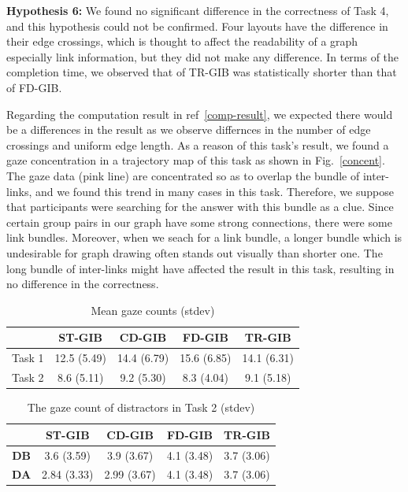 \documentclass{vgtc}                          %
\begin{document}
{\bf Hypothesis 6:} We found no significant difference in the correctness of Task 4, and this hypothesis could not be confirmed.
Four layouts have the difference in their edge crossings, which is thought to affect the readability of a graph especially link information, but they did not make any difference.
In terms of the completion time, we observed that of TR-GIB was statistically shorter than that of FD-GIB.

Regarding the computation result in ref~\ref{comp-result}, we expected there would be a differences in the result as we observe differnces in the number of edge crossings and uniform edge length.
As a reason of this task's result, we found a gaze concentration in a trajectory map of this task as shown in Fig.~\ref{concent}.
The gaze data (pink line) are concentrated so as to overlap the bundle of inter-links, and we found this trend in many cases in this task.
Therefore, we suppose that participants were searching for the answer with this bundle as a clue.
Since certain group pairs in our graph have some strong connections, there were some link bundles.
Moreover, when we seach for a link bundle, a longer bundle which is undesirable for graph drawing often stands out visually than shorter one.
The long bundle of inter-links might have affected the result in this task, resulting in no difference in the correctness.

\begin{table}[htb]
  \begin{center}
   \caption{Mean gaze counts (stdev)}
    \begin{tabular}{|c|c|c|c|c|} \hline
      & ST-GIB & CD-GIB & FD-GIB & TR-GIB \\ \hline
      Task 1 & 12.5 (5.49) & 14.4 (6.79) & 15.6 (6.85) & 14.1 (6.31) \\ \hline
      Task 2 & 8.6 (5.11) & 9.2 (5.30) & 8.3 (4.04) & 9.1 (5.18) \\ \hline
    \end{tabular}
  \end{center}
  \label{table-gazecount}
\end{table}

\begin{table}[htb]
  \begin{center}
   \caption{The gaze count of distractors in Task 2 (stdev)}
    \begin{tabular}{|c|c|c|c|c|} \hline
      & ST-GIB & CD-GIB & FD-GIB & TR-GIB \\ \hline
      {\bf DB} & 3.6 (3.59) & 3.9 (3.67) & 4.1 (3.48) & 3.7 (3.06) \\ \hline
      {\bf DA}  & 2.84 (3.33) & 2.99 (3.67) & 4.1 (3.48) & 3.7 (3.06) \\ \hline
    \end{tabular}
  \end{center}
  \label{table-dist2}
\end{table}
\end{document}
